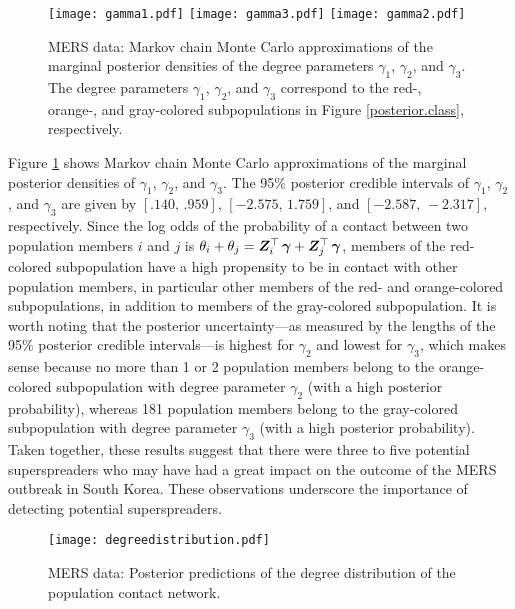 \documentclass[12pt,usenatbib,referee]{article}
\renewcommand{\alert}{\textcolor{black}}
\begin{document}
{\begin{figure}[t]
\caption{\label{marginal.posteriors}
MERS data: Markov chain Monte Carlo approximations of the marginal posterior densities of the degree parameters $\gamma_1$, $\gamma_2$, and $\gamma_3$.
The degree parameters $\gamma_1$, $\gamma_2$, and $\gamma_3$ correspond to the red-,
orange-,
and gray-colored subpopulations in Figure \ref{posterior.class},
respectively.}\s
\begin{center}
\texttt{[image: gamma1.pdf]}
\texttt{[image: gamma3.pdf]}
\texttt{[image: gamma2.pdf]}
\end{center}
\end{figure}
Figure \ref{marginal.posteriors} shows Markov chain Monte Carlo approximations of the marginal posterior densities of $\gamma_1$,
$\gamma_2$,
and $\gamma_3$.
The 95\% posterior credible intervals of $\gamma_1$,
$\gamma_2$,
and $\gamma_3$ are given by $[.140,\, .959]$,
$[-2.575,\, 1.759]$,\;
and $[-2.587,\, -2.317]$,\;
respectively.
Since the log odds of the probability of a contact between two population members $i$ and $j$ is $\theta_i + \theta_j = \bm{Z}_i^\top\, \mbox{\boldmath$\gamma$} + \bm{Z}_j^\top\, \mbox{\boldmath$\gamma$}$,
members of the red-colored subpopulation have a high propensity to be in contact with other population members,
in particular other members of the red- and orange-colored subpopulations,
in addition to members of the gray-colored subpopulation.
It is worth noting that the posterior uncertainty---as measured by the lengths of the 95\% posterior credible intervals---is highest for $\gamma_2$ and lowest for $\gamma_3$, 
which makes sense because no more than 1 or 2 population members belong to the orange-colored subpopulation with degree parameter $\gamma_2$ (with a high posterior probability),
whereas 181 population members belong to the gray-colored subpopulation with degree parameter $\gamma_3$ (with a high posterior probability).
Taken together,
these results suggest that there were three to five potential superspreaders who may have had a great impact on the outcome of the MERS outbreak in South Korea.
These observations underscore the importance of detecting potential superspreaders.}

\begin{figure}
\caption{\label{ppc.degrees}
MERS data: Posterior predictions of the degree distribution of the population contact network.}\s
\centering
  \texttt{[image: degreedistribution.pdf]}
\end{figure}

\alert{}
\end{document}
